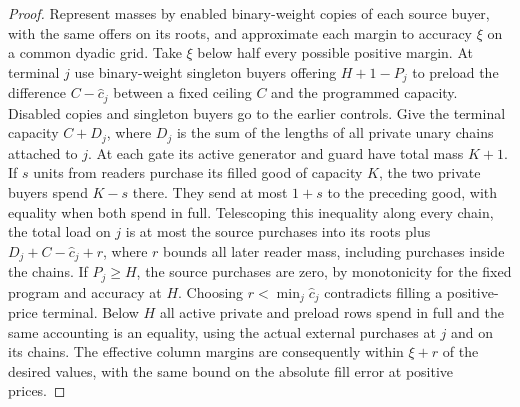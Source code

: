 \documentclass[11pt,oneside,openany,notitlepage]{report}
\begin{document}
\begin{proof}
Represent masses by enabled binary-weight copies of each source buyer,
with the same offers on its roots, and approximate each margin to
accuracy \(\xi\) on a common dyadic grid. Take \(\xi\) below half every
possible positive margin. At terminal \(j\) use binary-weight singleton
buyers offering \(H+1-P_j\) to preload the difference
\(C-\widehat c_j\) between a fixed ceiling \(C\) and the programmed
capacity. Disabled copies and singleton buyers go to the earlier
controls. Give the terminal capacity \(C+D_j\), where \(D_j\) is the
sum of the lengths of all private unary chains attached to \(j\).
At each gate its active generator and guard have total mass \(K+1\).
If \(s\) units from readers purchase its filled good of capacity \(K\),
the two private buyers spend \(K-s\) there. They send at most \(1+s\)
to the preceding good, with equality when both spend in full.
Telescoping this inequality along every chain,
the total load on \(j\) is at most the source purchases into its roots
plus \(D_j+C-\widehat c_j+r\), where \(r\) bounds all later reader
mass, including purchases inside the chains. If \(P_j\ge H\), the source
purchases are zero, by monotonicity for the fixed program and accuracy
at \(H\). Choosing \(r<\min_j\widehat c_j\) contradicts filling a
positive-price terminal. Below \(H\) all active private and preload rows
spend in full and the same accounting is an equality, using the actual
external purchases at \(j\) and on its chains. The effective column
margins are consequently within \(\xi+r\) of the desired values, with
the same bound on the absolute fill error at positive prices.


\end{proof}
\end{document}
